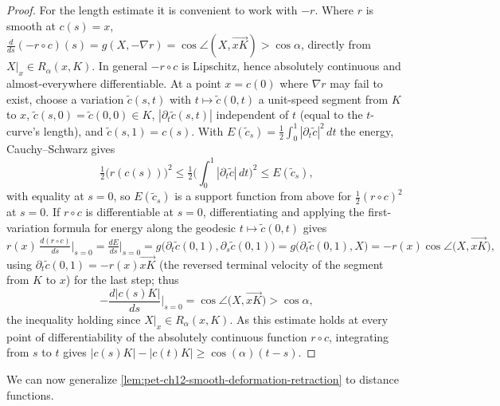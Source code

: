 \begin{proof}
  For the length estimate it is convenient to work with $-r$. Where $r$ is
  smooth at $c(s)=x$, $\tfrac{d}{ds}(-r\circ c)(s)=g(X,-\nabla r)
  =\cos\angle(X,\overrightarrow{xK})>\cos\alpha$, directly from
  $X|_x\in R_\alpha(x,K)$. In general $-r\circ c$ is Lipschitz, hence
  absolutely continuous and almost-everywhere differentiable. At a point
  $x=c(0)$ where $\nabla r$ may fail to exist, choose a variation
  $\tilde c(s,t)$ with $t\mapsto\tilde c(0,t)$ a unit-speed segment from $K$
  to $x$, $\tilde c(s,0)=\tilde c(0,0)\in K$, $|\partial_t\tilde c(s,t)|$
  independent of $t$ (equal to the $t$-curve's length), and
  $\tilde c(s,1)=c(s)$. With $E(\tilde c_s)=\tfrac12\int_0^1|\partial_t\tilde
  c|^2\,dt$ the energy, Cauchy--Schwarz gives
  \[
    \tfrac12\big(r(c(s))\big)^2
    \le\tfrac12\Big(\int_0^1|\partial_t\tilde c|\,dt\Big)^2
    \le E(\tilde c_s),
  \]
  with equality at $s=0$, so $E(\tilde c_s)$ is a support function from above
  for $\tfrac12(r\circ c)^2$ at $s=0$. If $r\circ c$ is differentiable at
  $s=0$, differentiating and applying the first-variation formula for energy
  along the geodesic $t\mapsto\tilde c(0,t)$ gives
  \[
    r(x)\,\tfrac{d(r\circ c)}{ds}\Big|_{s=0}=\tfrac{dE}{ds}\Big|_{s=0}
    =g\big(\partial_t\tilde c(0,1),\partial_s\tilde c(0,1)\big)
    =g\big(\partial_t\tilde c(0,1),X\big)
    =-r(x)\cos\angle\big(X,\overrightarrow{xK}\big),
  \]
  using $\partial_t\tilde c(0,1)=-r(x)\overrightarrow{xK}$ (the reversed
  terminal velocity of the segment from $K$ to $x$) for the last step; thus
  \[
    -\frac{d|c(s)K|}{ds}\Big|_{s=0}=\cos\angle\big(X,\overrightarrow{xK}\big)>\cos\alpha,
  \]
  the inequality holding since $X|_x\in R_\alpha(x,K)$. As this estimate holds
  at every point of differentiability of the absolutely continuous function
  $r\circ c$, integrating from $s$ to $t$ gives
  $|c(s)K|-|c(t)K|\ge\cos(\alpha)(t-s)$.
\end{proof}

We can now generalize \cref{lem:pet-ch12-smooth-deformation-retraction} to
distance functions.

